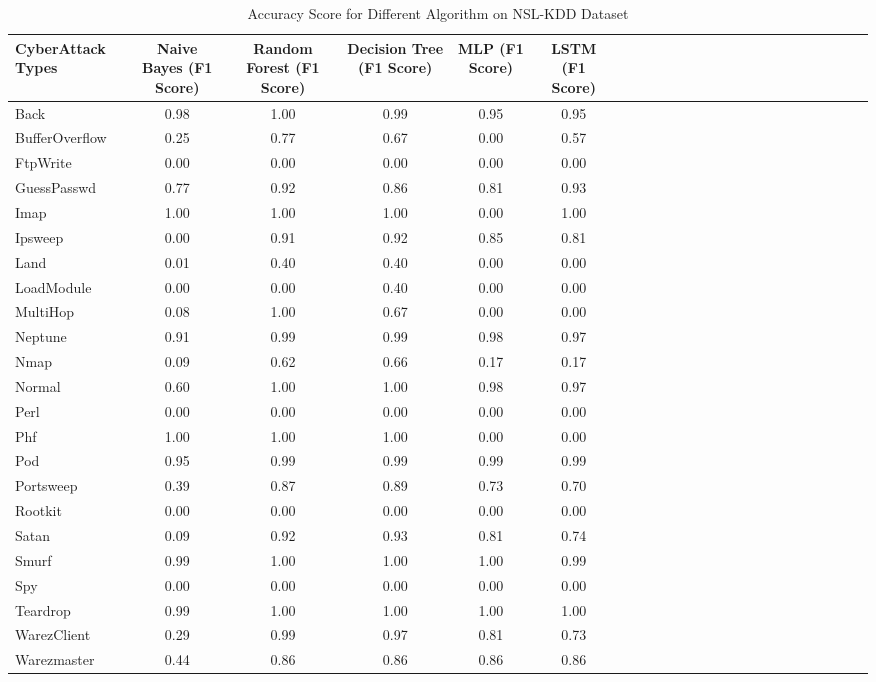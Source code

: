 \documentclass[conference]{IEEEtran}
\begin{document}
\begin{table}
\caption{Accuracy Score for Different Algorithm on NSL-KDD Dataset}
\label{table:06}
\begin{tabularx}{\textwidth}{@{}l*{22}{C}c@{}}
\toprule
\bf CyberAttack Types & \bf Naive Bayes (F1 Score)  & \bf Random Forest (F1 Score) & \bf Decision Tree (F1 Score) & \bf MLP (F1 Score) & \bf LSTM (F1 Score) \\ 
\midrule
Back            & 0.98      & 1.00   & 0.99         & 0.95    & 0.95  \\ 
BufferOverflow  & 0.25      & 0.77   & 0.67         & 0.00    & 0.57   \\ 
FtpWrite        & 0.00      & 0.00   & 0.00         & 0.00    & 0.00   \\ 
GuessPasswd     & 0.77      & 0.92   & 0.86         & 0.81    & 0.93  \\ 
Imap            & 1.00      & 1.00   & 1.00         & 0.00    & 1.00 \\ 
Ipsweep         & 0.00      & 0.91   & 0.92         & 0.85    & 0.81  \\ 
Land            & 0.01      & 0.40   & 0.40         & 0.00    & 0.00 \\ 
LoadModule      & 0.00      & 0.00   & 0.40         & 0.00    & 0.00  \\ 
MultiHop        & 0.08      & 1.00   & 0.67         & 0.00    & 0.00  \\ 
Neptune         & 0.91      & 0.99   & 0.99         & 0.98    & 0.97   \\ 
Nmap            & 0.09      & 0.62   & 0.66         & 0.17    & 0.17  \\ 
Normal          & 0.60      & 1.00   & 1.00         & 0.98    & 0.97  \\ 
Perl            & 0.00      & 0.00   & 0.00         & 0.00    & 0.00   \\ 
Phf             & 1.00      & 1.00   & 1.00         & 0.00    & 0.00  \\ 
Pod             & 0.95      & 0.99   & 0.99         & 0.99    & 0.99 \\ 
Portsweep       & 0.39      & 0.87   & 0.89         & 0.73    & 0.70  \\ 
Rootkit         & 0.00      & 0.00   & 0.00         & 0.00    & 0.00 \\ 
Satan           & 0.09      & 0.92   & 0.93         & 0.81    & 0.74  \\ 
Smurf           & 0.99      & 1.00   & 1.00         & 1.00    & 0.99  \\ 
Spy             & 0.00      & 0.00   & 0.00         & 0.00    & 0.00   \\ 
Teardrop        & 0.99      & 1.00   & 1.00         & 1.00    & 1.00  \\ 
WarezClient     & 0.29      & 0.99   & 0.97         & 0.81    & 0.73   \\ 
Warezmaster     & 0.44      & 0.86   & 0.86         & 0.86    & 0.86  \\ 


\bottomrule
\end{tabularx}
\end{table}
\end{document}

